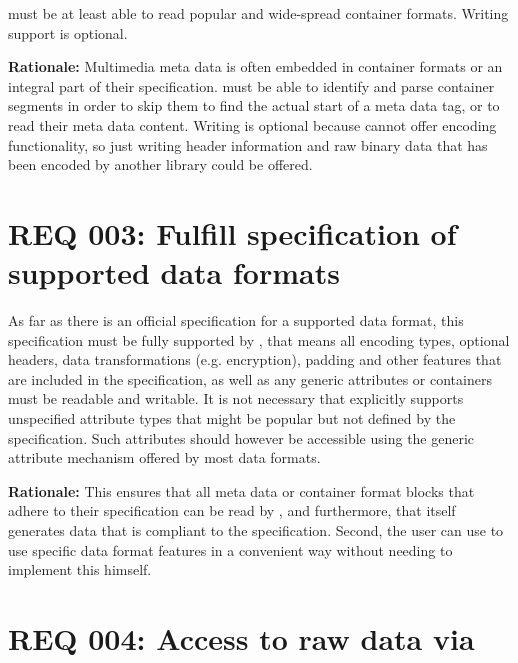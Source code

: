 \LibName{} must be at least able to read popular and wide-spread container formats. Writing support is optional.

\textbf{Rationale:} Multimedia meta data is often embedded in container formats or an integral part of their specification. \LibName{} must be able to identify and parse container segments in order to skip them to find the actual start of a meta data tag, or to read their meta data content. Writing is optional because \LibName{} cannot offer encoding functionality, so just writing header information and raw binary data that has been encoded by another library could be offered.


\section{REQ 003: Fulfill specification of supported data formats}
\label{sec:REQ003SpezifikationUnterstuetzterMetadatenUndContainerformateErfuellen}

As far as there is an official specification for a supported data format, this specification must be fully supported by \LibName{}, that means all encoding types, optional headers, data transformations (e.g. encryption), padding and other features that are included in the specification, as well as any generic attributes or containers must be readable and writable. It is not necessary that \LibName{} explicitly supports unspecified attribute types that might be popular but not defined by the specification. Such attributes should however be accessible using the generic attribute mechanism offered by most data formats.

\textbf{Rationale:} This ensures that all meta data or container format blocks that adhere to their specification can be read by \LibName{}, and furthermore, that \LibName{} itself generates data that is compliant to the specification. Second, the user can use \LibName{} to use specific data format features in a convenient way without needing to implement this himself.


\section{REQ 004: Access to raw data via \LibName{}}
\label{sec:REQ004ZugriffAufAlleRohdatenUeberDieLibrary}

